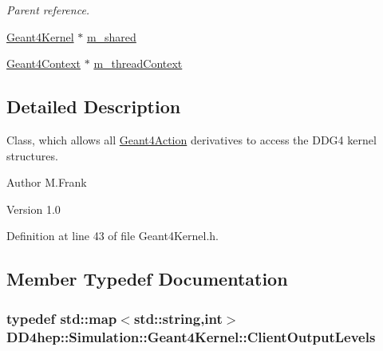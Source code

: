 \begin{DoxyCompactItemize}
\begin{DoxyCompactList}\small\item\em Parent reference. \item\end{DoxyCompactList}\item 
\hyperlink{class_d_d4hep_1_1_simulation_1_1_geant4_kernel}{Geant4Kernel} $\ast$ \hyperlink{class_d_d4hep_1_1_simulation_1_1_geant4_kernel_a47da20469676a2497cbf580428984362}{m\_\-shared}
\item 
\hyperlink{class_d_d4hep_1_1_simulation_1_1_geant4_context}{Geant4Context} $\ast$ \hyperlink{class_d_d4hep_1_1_simulation_1_1_geant4_kernel_a774c57eb5d21094d0ecca5db90f24998}{m\_\-threadContext}
\end{DoxyCompactItemize}


\subsection{Detailed Description}
Class, which allows all \hyperlink{class_d_d4hep_1_1_simulation_1_1_geant4_action}{Geant4Action} derivatives to access the DDG4 kernel structures. \begin{DoxyAuthor}{Author}
M.Frank 
\end{DoxyAuthor}
\begin{DoxyVersion}{Version}
1.0 
\end{DoxyVersion}


Definition at line 43 of file Geant4Kernel.h.

\subsection{Member Typedef Documentation}
\hypertarget{class_d_d4hep_1_1_simulation_1_1_geant4_kernel_a259066f5e9a56bdbfc9718a2b42b8b06}{
\subsubsection[{ClientOutputLevels}]{\setlength{\rightskip}{0pt plus 5cm}typedef std::map$<$std::string,int$>$ {\bf DD4hep::Simulation::Geant4Kernel::ClientOutputLevels}}}
\label{class_d_d4hep_1_1_simulation_1_1_geant4_kernel_a259066f5e9a56bdbfc9718a2b42b8b06}



